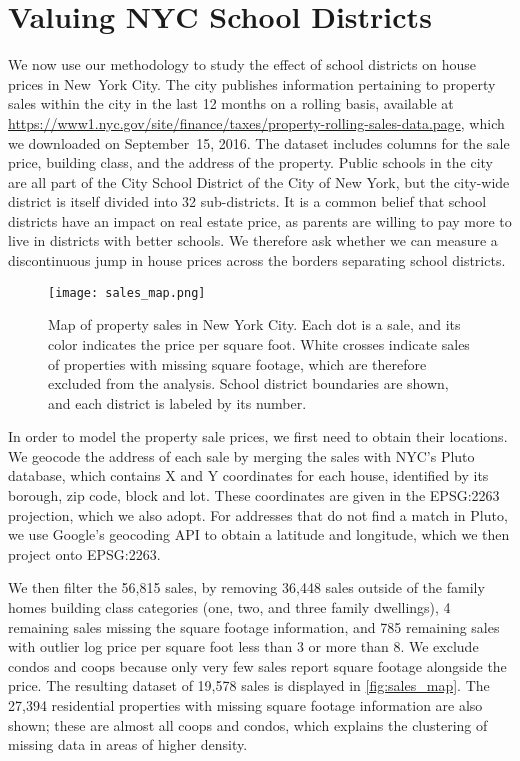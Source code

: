\section{Valuing NYC School Districts}
\label{sec:NYC_example}

We now use our methodology to study the effect
of school districts on house prices in New~York City.
The city publishes information pertaining to property sales within the city in the last 12 months on a rolling basis,
available at \url{https://www1.nyc.gov/site/finance/taxes/property-rolling-sales-data.page},
which we downloaded on September~15, 2016.
The dataset includes columns for the sale price, building class, and the address of the property.
Public schools in the city are all part of the City School District of the City of New York, but the city-wide district is itself divided into 32 sub-districts.
It is a common belief that school districts have an impact on real estate price, as parents are willing to pay more to live in districts with better schools.
We therefore ask whether we can measure a discontinuous jump in house prices across the borders separating school districts.

\begin{figure}[tb]
    \centering
    \texttt{[image: sales\_map.png]}
    \caption{\label{fig:sales_map}Map of property sales in New York City. Each dot is a sale, and its color indicates the price per square foot. White crosses indicate sales of properties with missing square footage, which are therefore excluded from the analysis. School district boundaries are shown, and each district is labeled by its number.}
\end{figure}

In order to model the property sale prices, we first need to obtain their locations.
We geocode the address of each sale by merging the sales with NYC's Pluto database, which contains X and Y coordinates for each house, identified by its borough, zip code, block and lot.
These coordinates are given in the EPSG:2263 projection, which we also adopt.
For addresses that do not find a match in Pluto, we use Google's geocoding API to obtain a latitude and longitude, which we then project onto EPSG:2263.

We then filter the 56,815 sales, by removing
36,448 sales outside of the family homes building class categories (one, two, and three family dwellings),
4 remaining sales missing the square footage information,
and 785 remaining sales with outlier log price per square foot less than 3 or more than 8.
We exclude condos and coops because only very few sales report square footage alongside the price.
The resulting dataset of 19,578 sales is displayed in \autoref{fig:sales_map}.
The 27,394 residential properties with missing square footage information are also shown;
these are almost all coops and condos, which explains the clustering of missing data in areas of higher density.

